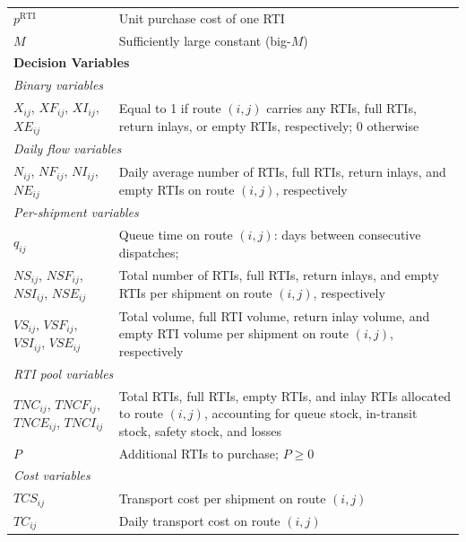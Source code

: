 \begin{longtable}{|p{}|p{}|}
$p^{\text{RTI}}$
  & Unit purchase cost of one RTI \\
$M$
  & Sufficiently large constant (big-$M$) \\
\hline
\multicolumn{2}{|l|}{\textbf{Decision Variables}}\\ \hline
\multicolumn{2}{|l|}{\textit{Binary variables}}\\ \hline
$X_{ij}$, $ XF_{ij}$, $ XI_{ij}$, $ XE_{ij}$
  & Equal to 1 if route $(i,j)$ carries any RTIs, full RTIs,
    return inlays, or empty RTIs, respectively; 0 otherwise \\
\hline
\multicolumn{2}{|l|}{\textit{Daily flow variables}}\\ \hline
$N_{ij}$, $ NF_{ij}$, $ NI_{ij}$, $ NE_{ij}$
  & Daily average number of RTIs, full RTIs, return inlays, and
    empty RTIs on route $(i,j)$, respectively \\
\hline
\multicolumn{2}{|l|}{\textit{Per-shipment variables}}\\ \hline
$q_{ij}$
  & Queue time on route $(i,j)$: days between consecutive
    dispatches; \\
$NS_{ij}$, $ NSF_{ij}$, $ NSI_{ij}$, $ NSE_{ij}$
  & Total number of RTIs, full RTIs, return inlays, and empty RTIs
    per shipment on route $(i,j)$, respectively \\
$VS_{ij}$, $VSF_{ij}$, $VSI_{ij}$, $VSE_{ij}$
  & Total volume, full RTI volume, return inlay volume, and empty
    RTI volume per shipment on route $(i,j)$, respectively \\\hline
\multicolumn{2}{|l|}{\textit{RTI pool variables}}\\ \hline
$TNC_{ij}$, $ TNCF_{ij}$, $ TNCE_{ij}$, $ TNCI_{ij}$
  & Total RTIs, full RTIs, empty RTIs, and inlay RTIs allocated to route
    $(i,j)$, accounting for queue stock, in-transit stock, safety
    stock, and losses \\
$P$
  & Additional RTIs to purchase; $P \geq 0$ \\
\hline
\multicolumn{2}{|l|}{\textit{Cost variables}}\\ \hline
$TCS_{ij}$
  & Transport cost per shipment on route $(i,j)$ \\
$TC_{ij}$
  & Daily transport cost on route $(i,j)$ \\
\hline
\end{longtable}



